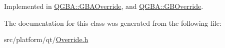 Implemented in \mbox{\hyperlink{class_q_g_b_a_1_1_g_b_a_override_ac998ad9838873fb7beeeb3cd741856d0}{Q\+G\+B\+A\+::\+G\+B\+A\+Override}}, and \mbox{\hyperlink{class_q_g_b_a_1_1_g_b_override_ad14c3a566eeeee641c4c78068b483ace}{Q\+G\+B\+A\+::\+G\+B\+Override}}.



The documentation for this class was generated from the following file\+:\begin{DoxyCompactItemize}
\item 
src/platform/qt/\mbox{\hyperlink{_override_8h}{Override.\+h}}\end{DoxyCompactItemize}
